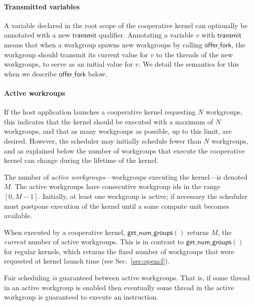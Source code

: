 \documentclass[numbers,nocopyrightspace,10pt]{sigplanconf}
\newcommand{\mysec}{Sec.~}
\newcommand{\transmit}{\mathsf{transmit}}
\newcommand{\offerfork}{\mathsf{offer\_fork}}
\newcommand{\getnumgroups}{\mathsf{get\_num\_groups}}
\begin{document}
\paragraph{Transmitted variables}

A variable declared in the root scope of the cooperative kernel can
optionally be annotated with a new $\transmit$ qualifier.  Annotating
a variable $v$ with $\transmit$ means that when a workgroup spawns new
workgroups by calling $\offerfork$, the workgroup should transmit its
current value for $v$ to the threads of the new workgroups, to serve
as an initial value for $v$.  We detail the semantics for this when we
describe $\offerfork$ below.

\paragraph{Active workroups}

If the host application launches a cooperative kernel requesting $N$
workgroups, this indicates that the kernel should be executed with a
maximum of $N$ workgroups, and that as many workgroups as possible, up
to this limit, are desired.  However, the scheduler may initially
schedule fewer than $N$ workgroups, and as explained below the number
of workgroups that execute the cooperative kernel can change during
the lifetime of the kernel.

The number of \emph{active workgroups}---workgroups executing the
kernel---is denoted $M$.  The active workgroups
have consecutive workgroup ids in the range $[0, M-1]$.
Initially, at least one workgroup is active;
if necessary the scheduler must postpone execution of the kernel until
a some compute unit becomes available.  

When executed by a cooperative
kernel, $\getnumgroups()$ returns $M$, the \emph{current} number of
active workgroups.  This is in contrast to $\getnumgroups()$ for
regular kernels, which returns the fixed number of workgroups that
were requested at kernel launch time (see \mysec\ref{sec:opencl}).

Fair scheduling \emph{is} guaranteed between active workgroups.  That is, if
some thread in an active workgroup is enabled then eventually some
thread in the active workgroup is guaranteed to execute an
instruction.

\end{document}

